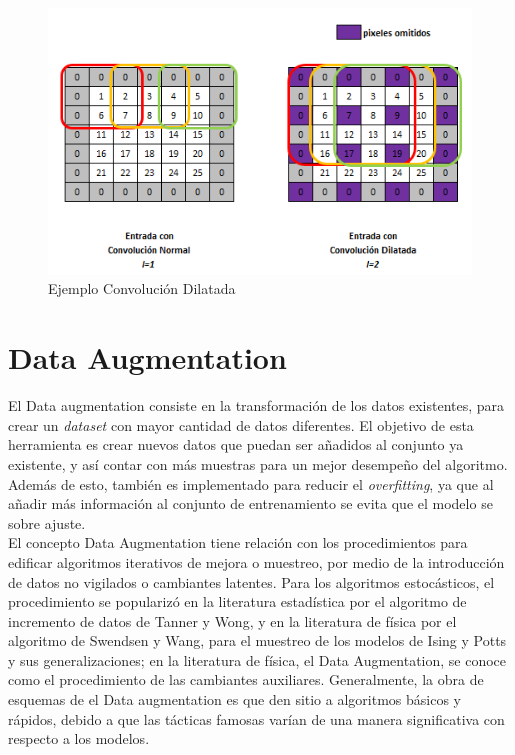 \begin{figure}[ht]
	\centering
	\includegraphics[scale=0.6]{Figs/Convolucion_dilatada.png}
	\caption{Ejemplo Convolución Dilatada}
	\label{fig:cd}
\end{figure}


\section{Data Augmentation}
El Data augmentation consiste en la transformación de los datos existentes, para crear un \textit{dataset} con mayor cantidad de datos diferentes. El objetivo de esta herramienta es crear nuevos datos que puedan ser añadidos al conjunto ya existente, y así contar con más muestras para un mejor desempeño del algoritmo. Además de esto, también es implementado para reducir el \textit{overfitting}, ya que al añadir más información al conjunto de entrenamiento se evita que el modelo se sobre ajuste. \\


El concepto Data Augmentation tiene relación con los procedimientos para edificar algoritmos iterativos de mejora o muestreo, por medio de la introducción de datos no vigilados o cambiantes latentes. Para los algoritmos estocásticos, el procedimiento se popularizó en la literatura estadística por el algoritmo de incremento de datos de Tanner y Wong, y en la literatura de física por el algoritmo de Swendsen y Wang, para el muestreo de los modelos de Ising y Potts y sus generalizaciones; en la literatura de física, el Data Augmentation, se conoce como el procedimiento de las cambiantes auxiliares. Generalmente, la obra de esquemas de el Data augmentation es que den sitio a algoritmos básicos y rápidos, debido a que las tácticas famosas varían de una manera significativa con respecto a los modelos.\cite{van2001art}

